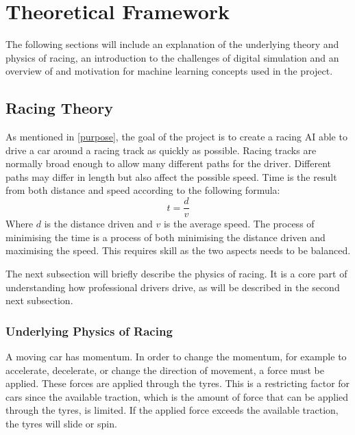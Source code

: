 \chapter{Theoretical Framework}


The following sections will include an explanation of the underlying theory and physics of racing, an introduction to the challenges of digital simulation and an overview of and motivation for machine learning concepts used in the project. 

\section{Racing Theory}
\label{racing_theory}

As mentioned in \ref{purpose}, the goal of the project is to create a racing AI able to drive a car around a racing track as quickly as possible. Racing tracks are normally broad enough to allow many different paths for the driver. Different paths may differ in length but also affect the possible speed. Time is the result from both distance and speed according to the following formula:
\begin{equation}
t = \frac{d}{v}
\end{equation}
Where $d$ is the distance driven and $v$ is the average speed. The process of minimising the time is a process of both minimising the distance driven and maximising the speed. This requires skill as the two aspects needs to be balanced.

The next subsection will briefly describe the physics of racing. It is a core part of understanding how professional drivers drive, as will be described in the second next subsection.

\subsection{Underlying Physics of Racing}
A moving car has momentum. In order to change the momentum, for example to accelerate, decelerate, or change the direction of movement, a force must be applied. These forces are applied through the tyres. This is a restricting factor for cars since the available traction, which is the amount of force that can be applied through the tyres, is limited. If the applied force exceeds the available traction, the tyres will slide or spin. 

